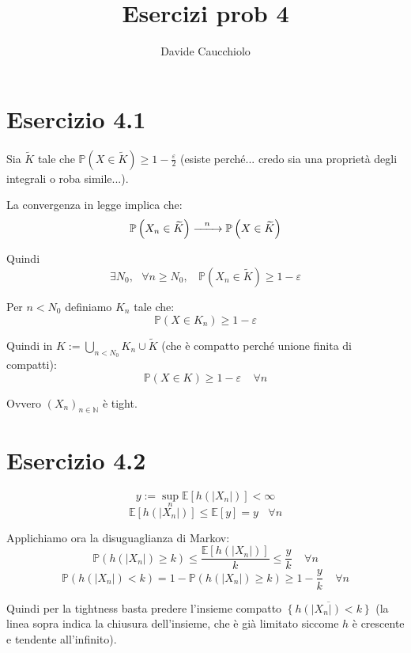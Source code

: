 \documentclass{article}
\title{Esercizi prob 4}
\author{Davide Caucchiolo}
\newcommand{\myrightarrow}[1]{\xrightarrow{\makebox[2em][c]{$\scriptstyle#1$}}}
\begin{document}
\maketitle
\section{Esercizio 4.1}
Sia $\widetilde{K}$ tale che $\mathbb{P}\left(X\in \widetilde{K}\right) \geq  1-\frac{\varepsilon }{2}$ (esiste perché... credo sia una proprietà degli integrali o roba simile...).

La convergenza in legge implica che:
\[
	\mathbb{P}\left(X_n\in \widetilde{K}\right) \myrightarrow{n} \mathbb{P}\left(X\in \widetilde{K}\right)
\]

Quindi
\[
	\exists N_0,\ \ \ \forall n\geq N_0,\ \ \ \ \mathbb{P}\left(X_n\in \widetilde{K}\right)\geq 1-\varepsilon 
\]

Per $n<N_0$ definiamo $K_n$ tale che:
\[
	\mathbb{P}\left(X\in K_n\right) \geq  1-\varepsilon 
\]

Quindi in $K:= \bigcup_{n<N_0} K_n \cup  \widetilde{K}$ (che è compatto perché unione finita di compatti):
\[
	\mathbb{P}\left(X\in K\right) \geq  1-\varepsilon\ \ \ \ \ \forall n
\]

Ovvero $\left(X_n\right)_{n\in \mathbb{N}}$ è tight.


\section{Esercizio 4.2}
\[
	y:= \sup_n \mathbb{E}\left[h\left(\left|X_n\right|\right)\right] < \infty 
\]
\[
	\mathbb{E}\left[h\left(\left|X_n\right|\right)\right] \leq  \mathbb{E}\left[y\right] = y\ \ \ \ \forall n
\]

Applichiamo ora la disuguaglianza di Markov:
\[
	\mathbb{P}\left(h\left(\left|X_n\right|\right) \geq  k\right) \leq  \frac{\mathbb{E}\left[h\left(\left|X_n\right|\right)\right]}{k} \leq  \frac{y}{k}\ \ \ \ \ \forall n
\]
\[
	\mathbb{P}\left(h\left(\left|X_n\right|\right) < k\right) = 1- \mathbb{P}\left(h\left(\left|X_n\right|\right) \geq  k\right) \geq  1-\frac{y}{k}\ \ \ \ \ \forall n
\]

Quindi per la tightness basta predere l'insieme compatto $\overline{\left\{h\left(\left|X_n\right|\right) < k\right\}}$ (la linea sopra indica la chiusura dell'insieme, che è già limitato siccome $h$ è crescente e tendente all'infinito).
\end{document}
